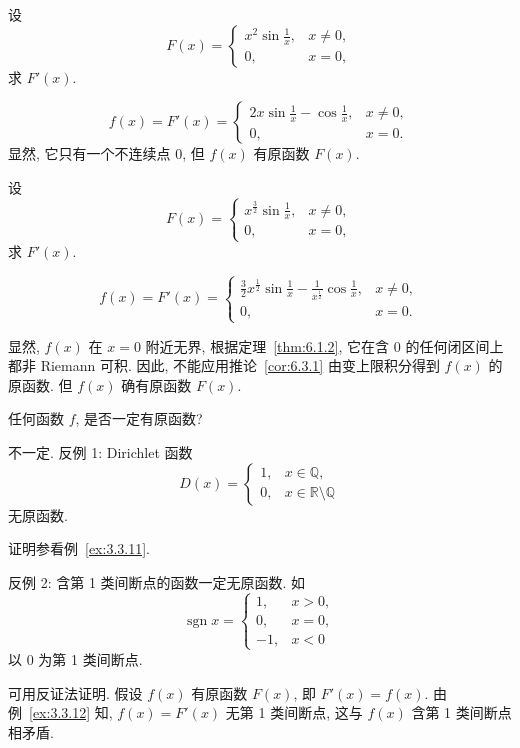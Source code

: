 \begin{example}\label{ex:5.1.8}
设
\[
F(x)=
\begin{cases}
x^{2}\sin\frac{1}{x}, & x\neq 0,\\
0, & x=0,
\end{cases}
\]
求 $F'(x)$.
\end{example}

\begin{solution}
\[
f(x)=F'(x)=
\begin{cases}
2x\sin\frac{1}{x}-\cos\frac{1}{x}, & x\neq 0,\\
0, & x=0.
\end{cases}
\]
显然, 它只有一个不连续点 $0$, 但 $f(x)$ 有原函数 $F(x)$.
\end{solution}

\begin{example}\label{ex:5.1.9}
设
\[
F(x)=
\begin{cases}
x^{\frac{3}{2}}\sin\frac{1}{x}, & x\neq 0,\\
0, & x=0,
\end{cases}
\]
求 $F'(x)$.
\end{example}

\begin{solution}
\[
f(x)=F'(x)=
\begin{cases}
\frac{3}{2}x^{\frac{1}{2}}\sin\frac{1}{x}-\frac{1}{x^{\frac{1}{2}}}\cos\frac{1}{x}, & x\neq 0,\\
0, & x=0.
\end{cases}
\]
\end{solution}

\begin{remark}\label{rmk:5.1.1}
显然, $f(x)$ 在 $x=0$ 附近无界, 根据定理~\ref{thm:6.1.2}, 它在含 $0$ 的任何闭区间上都非 Riemann 可积. 因此, 不能应用推论~\ref{cor:6.3.1} 由变上限积分得到 $f(x)$ 的原函数. 但 $f(x)$ 确有原函数 $F(x)$.
\end{remark}

\begin{example}\label{ex:5.1.10}
任何函数 $f$, 是否一定有原函数?
\end{example}

\begin{solution}
不一定. 反例 1: Dirichlet 函数
\[
D(x)=
\begin{cases}
1, & x\in\mathbb{Q},\\
0, & x\in\mathbb{R}\setminus\mathbb{Q}
\end{cases}
\]
无原函数.

证明参看例~\ref{ex:3.3.11}.

反例 2: 含第 1 类间断点的函数一定无原函数. 如
\[
\operatorname{sgn}x=
\begin{cases}
1, & x>0,\\
0, & x=0,\\
-1, & x<0
\end{cases}
\]
以 $0$ 为第 1 类间断点.

可用反证法证明. 假设 $f(x)$ 有原函数 $F(x)$, 即 $F'(x)=f(x)$. 由例~\ref{ex:3.3.12} 知, $f(x)=F'(x)$ 无第 1 类间断点, 这与 $f(x)$ 含第 1 类间断点相矛盾.
\end{solution}

